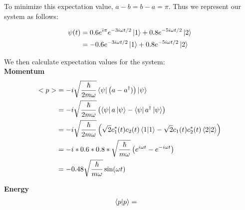 \documentclass[10pt]{article} %
\begin{document}
To minimize this expectation value, $a-b = b-a = \pi$. Thus we represent our system as follows:

\begin{align*}
  \psi(t) &= 0.6e^{i\pi}e^{-3i\omega t/2}\ket{1} + 0.8e^{-5i\omega t/2}\ket{2}\\
  &= -0.6e^{-3i\omega t/2}\ket{1} + 0.8e^{-5i\omega t/2}\ket{2}\\
\end{align*}

We then calculate expectation values for the system:\\

\textbf{Momentum}
\begin{align*}
  <p> &= -i\sqrt{\frac{\hbar}{2m\omega}}\bra{\psi}\left(a - a^\dagger)\right)\ket{\psi}\\
  &= -i\sqrt{\frac{\hbar}{2m\omega}}\left(\bra{\psi}a\ket{\psi}
  - \bra{\psi}a^\dagger\ket{\psi}\right)\\
  &= -i\sqrt{\frac{\hbar}{2m\omega}}\left(\sqrt{2}c_1^*(t)c_2(t)\bra{1}\ket{1}
  - \sqrt{2}c_1(t)c_2^*(t)\bra{2}\ket{2}\right)\\
  &= -i*0.6*0.8*\sqrt{\frac{\hbar}{m\omega}}\left(e^{i\omega t} - e^{-i\omega t}\right)\\
  &= -0.48\sqrt{\frac{\hbar}{m\omega}}\sin(\omega t)\\
\end{align*}

\textbf{Energy}
\begin{align*}
  \braket{p} &= 
\end{align*}
\end{document}
